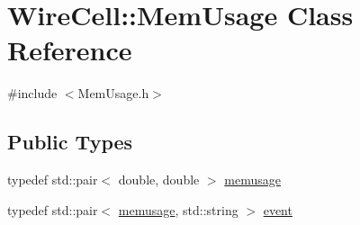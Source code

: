 \hypertarget{class_wire_cell_1_1_mem_usage}{}\section{Wire\+Cell\+:\+:Mem\+Usage Class Reference}
\label{class_wire_cell_1_1_mem_usage}


{\ttfamily \#include $<$Mem\+Usage.\+h$>$}

\subsection*{Public Types}
\begin{DoxyCompactItemize}
\item 
typedef std\+::pair$<$ double, double $>$ \hyperlink{class_wire_cell_1_1_mem_usage_ab022bc829c4166d0161f3c91195f062f}{memusage}
\item 
typedef std\+::pair$<$ \hyperlink{class_wire_cell_1_1_mem_usage_ab022bc829c4166d0161f3c91195f062f}{memusage}, std\+::string $>$ \hyperlink{class_wire_cell_1_1_mem_usage_ac40a9ad5d6984d90924a179ca77aab3b}{event}
\end{DoxyCompactItemize}
